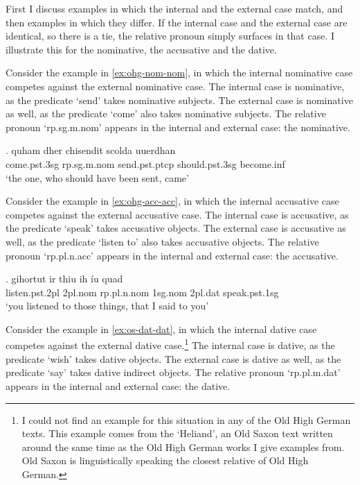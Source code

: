 First I discuss examples in which the internal and the external case match, and then examples in which they differ. If the internal case and the external case are identical, so there is a tie, the relative pronoun simply surfaces in that case. I illustrate this for the nominative, the accusative and the dative.

Consider the example in \ref{ex:ohg-nom-nom}, in which the internal nominative case competes against the external nominative case.
The internal case is nominative, as the predicate  `send' takes nominative subjects.
The external case is nominative as well, as the predicate  `come' also takes nominative subjects.
The relative pronoun  `\ac{rp}.\ac{sg}.\ac{m}.\ac{nom}' appears in the internal and external case: the nominative.

\exg. quham dher chisendit scolda uuerdhan\\
 come.\ac{pst}.3\ac{sg}\scsub{[nom]} \ac{rp}.\ac{sg}.\ac{m}.\ac{nom} send.\ac{pst}.\ac{ptcp}\scsub{[nom]} should.\ac{pst}.3\ac{sg} become.\ac{inf}\\
 `the one, who should have been sent, came' \label{ex:ohg-nom-nom}

Consider the example in \ref{ex:ohg-acc-acc}, in which the internal accusative case competes against the external accusative case.
The internal case is accusative, as the predicate  `speak' takes accusative objects.
The external case is accusative as well, as the predicate  `listen to' also takes accusative objects.
The relative pronoun  `\ac{rp}.\ac{pl}.\ac{n}.\ac{acc}' appears in the internal and external case: the accusative.

\exg. gihortut ir thiu ih íu quad\\
 listen.\ac{pst}.2\ac{pl}\scsub{[acc]} 2\ac{pl}.\ac{nom} \ac{rp}.\ac{pl}.\ac{n}.\ac{nom} 1\ac{sg}.\ac{nom} 2\ac{pl}.\ac{dat} speak.\ac{pst}.1\ac{sg}\scsub{[acc]}\\
 `you listened to those things, that I said to you' \label{ex:ohg-acc-acc}

Consider the example in \ref{ex:os-dat-dat}, in which the internal dative case competes against the external dative case.\footnote{
I could not find an example for this situation in any of the Old High German texts. This example comes from the `Heliand', an Old Saxon text written around the same time as the Old High German works I give examples from. Old Saxon is linguistically speaking the closest relative of Old High German.
}
The internal case is dative, as the predicate  `wish' takes dative objects.
The external case is dative as well, as the predicate  `say' takes dative indirect objects.
The relative pronoun  `\ac{rp}.\ac{pl}.\ac{m}.\ac{dat}' appears in the internal and external case: the dative.

